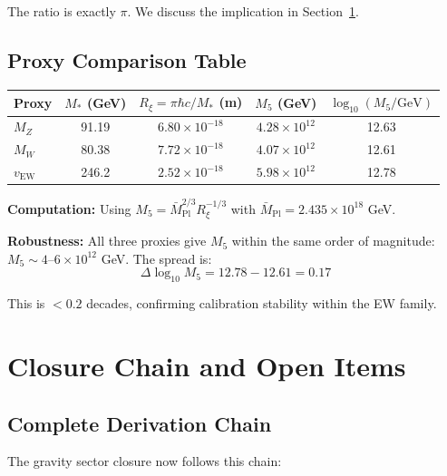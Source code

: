 \documentclass[11pt,a4paper]{article}
\newcommand{\Rxi}{R_\xi}
\newcommand{\Mplbar}{\bar{M}_{\mathrm{Pl}}}
\newcommand{\Mfive}{M_5}
\newcommand{\MZ}{M_Z}
\newcommand{\MW}{M_W}
\newcommand{\vEW}{v_{\mathrm{EW}}}
\begin{document}
The ratio is exactly $\pi$. We discuss the implication in Section~\ref{sec:closure}.

\subsection{Proxy Comparison Table}

\begin{center}
\begin{tabular}{lcccc}
\toprule
\textbf{Proxy} & \textbf{$M_*$ (GeV)} & \textbf{$\Rxi = \pi\hbar c/M_*$ (m)} & \textbf{$\Mfive$ (GeV)} & \textbf{$\log_{10}(\Mfive/\mathrm{GeV})$} \\
\midrule
$\MZ$ & 91.19 & $6.80 \times 10^{-18}$ & $4.28 \times 10^{12}$ & 12.63 \\
$\MW$ & 80.38 & $7.72 \times 10^{-18}$ & $4.07 \times 10^{12}$ & 12.61 \\
$\vEW$ & 246.2 & $2.52 \times 10^{-18}$ & $5.98 \times 10^{12}$ & 12.78 \\
\bottomrule
\end{tabular}
\end{center}

\textbf{Computation:} Using $\Mfive = \Mplbar^{2/3} \Rxi^{-1/3}$ with
$\Mplbar = 2.435 \times 10^{18}$ GeV.

\textbf{Robustness:} All three proxies give $\Mfive$ within the same order of
magnitude: $\Mfive \sim 4\text{--}6 \times 10^{12}$ GeV. The spread is:
\begin{equation}
\Delta \log_{10} \Mfive = 12.78 - 12.61 = 0.17
\label{eq:M5-spread}
\end{equation}

This is $< 0.2$ decades, confirming calibration stability within the EW family.

\section{Closure Chain and Open Items}
\label{sec:closure}

\subsection{Complete Derivation Chain}

The gravity sector closure now follows this chain:
\end{document}
